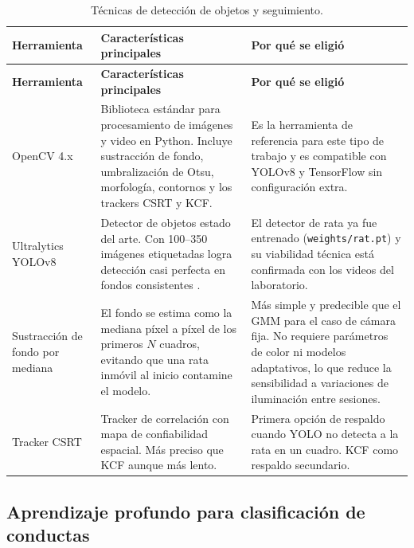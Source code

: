 \begin{longtable}{|p{2.3cm}|p{5.4cm}|p{5.4cm}|}
\caption{Técnicas de detección de objetos y seguimiento.
\label{tab:herr_cv}}\\
\hline
\textbf{Herramienta} & \textbf{Características principales} & \textbf{Por qué se eligió} \\
\hline
\endfirsthead
\hline
\textbf{Herramienta} & \textbf{Características principales} & \textbf{Por qué se eligió} \\
\hline
\endhead
\hline
\endfoot

OpenCV 4.x \cite{bradski2000}
    & Biblioteca estándar para procesamiento de imágenes y video en Python. Incluye
      sustracción de fondo, umbralización de Otsu, morfología, contornos y los
      trackers CSRT y KCF.
    & Es la herramienta de referencia para este tipo de trabajo y es compatible con
      YOLOv8 y TensorFlow sin configuración extra. \\
\hline
Ultralytics YOLOv8 \cite{jocher2023}
    & Detector de objetos estado del arte. Con 100--350 imágenes etiquetadas logra
      detección casi perfecta en fondos consistentes \cite{stadler2024_yolov8}.
    & El detector de rata ya fue entrenado (\texttt{weights/rat.pt}) y su viabilidad
      técnica está confirmada con los videos del laboratorio. \\
\hline
Sustracción de fondo por mediana \cite{piccardi2004}
    & El fondo se estima como la mediana píxel a píxel de los primeros $N$ cuadros,
      evitando que una rata inmóvil al inicio contamine el modelo.
    & Más simple y predecible que el GMM \cite{zivkovic2004} para el caso de cámara
      fija. No requiere parámetros de color ni modelos adaptativos, lo que reduce
      la sensibilidad a variaciones de iluminación entre sesiones. \\
\hline
Tracker CSRT \cite{lukezic2017}
    & Tracker de correlación con mapa de confiabilidad espacial. Más preciso que
      KCF aunque más lento.
    & Primera opción de respaldo cuando YOLO no detecta a la rata en un cuadro.
      KCF \cite{henriques2015} como respaldo secundario. \\
\hline

\end{longtable}

\subsection{Aprendizaje profundo para clasificación de conductas}

